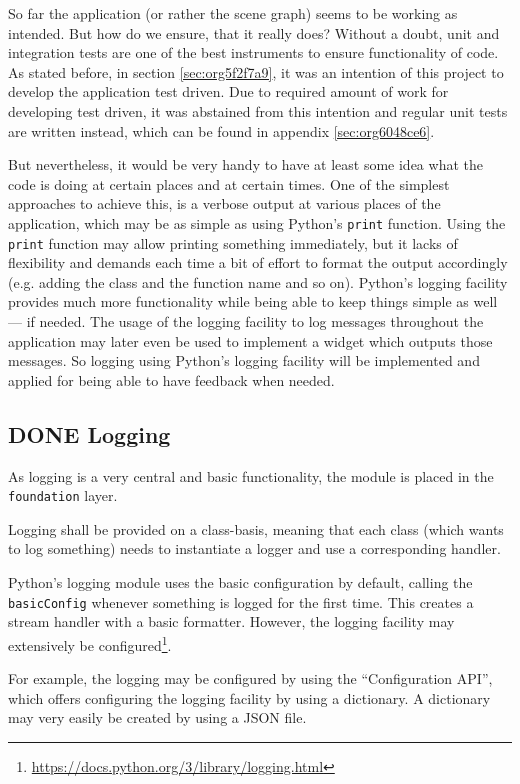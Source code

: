 \documentclass[10pt, openright, notitlepage]{scrreprt}
\begin{document}
So far the application (or rather the scene graph) seems to be working as
intended. But how do we ensure, that it really does? Without a doubt, unit and
integration tests are one of the best instruments to ensure functionality of
code. As stated before, in section \ref{sec:org5f2f7a9}, it was an intention of
this project to develop the application test driven. Due to required amount of
work for developing test driven, it was abstained from this intention and
regular unit tests are written instead, which can be found in appendix \ref{sec:org6048ce6}.

But nevertheless, it would be very handy to have at least some idea what the
code is doing at certain places and at certain times.
One of the simplest approaches to achieve this, is a verbose output at various
places of the application, which may be as simple as using Python's
\texttt{print} function. Using the \texttt{print} function may allow
printing something immediately, but it lacks of flexibility and demands each
time a bit of effort to format the output accordingly (e.g. adding the class and
the function name and so on). Python's logging facility provides much more
functionality while being able to keep things simple as well --- if needed.
The usage of the logging facility to log messages throughout the application may
later even be used to implement a widget which outputs those messages. So
logging using Python's logging facility will be implemented and applied for
being able to have feedback when needed.
\subsection{{\bfseries\sffamily DONE} Logging}
\label{sec:orge818cb4}
As logging is a very central and basic functionality, the module is placed in
the \texttt{foundation} layer.

Logging shall be provided on a class-basis, meaning that each class (which wants
to log something) needs to instantiate a logger and use a corresponding handler.

Python's logging module uses the basic configuration by default, calling the
\texttt{basicConfig} whenever something is logged for the first time. This
creates a stream handler with a basic formatter. However, the logging facility
may extensively be
configured\footnote{\url{https://docs.python.org/3/library/logging.html}}.

For example, the logging may be configured by using the ``Configuration API'',
which offers configuring the logging facility by using a dictionary. A
dictionary may very easily be created by using a JSON file.
\end{document}
